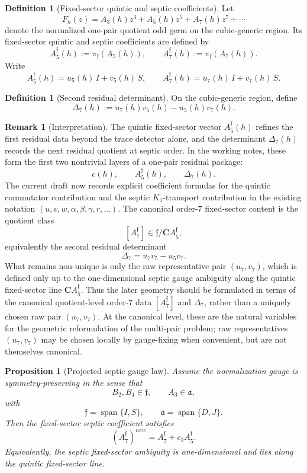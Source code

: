\documentclass[11pt,a4paper]{amsart}
\def\new{new}%
\theoremstyle{plain}
\newtheorem{proposition}[theorem]{Proposition}
\theoremstyle{definition}
\newtheorem{definition}[theorem]{Definition}
\newtheorem{remark}[theorem]{Remark}
\newcommand{\new}{\mathrm{new}}
\begin{document}
\begin{definition}[Fixed-sector quintic and septic coefficients]
\label{def:fixed-sector-quintic-septic}
Let
\[
F_h(z)=A_3(h)z^3+A_5(h)z^5+A_7(h)z^7+\cdots
\]
denote the normalized one-pair quotient odd germ on the cubic-generic region.
Its fixed-sector quintic and septic coefficients are defined by
\[
A_5^{\mathfrak f}(h):=\pi_{\mathfrak f}(A_5(h)),
\qquad
A_7^{\mathfrak f}(h):=\pi_{\mathfrak f}(A_7(h)).
\]
Write
\[
A_5^{\mathfrak f}(h)=u_5(h)\,I+v_5(h)\,S,
\qquad
A_7^{\mathfrak f}(h)=u_7(h)\,I+v_7(h)\,S.
\]
\end{definition}

\begin{definition}[Second residual determinant]
\label{def:second-residual-determinant}
On the cubic-generic region, define
\[
\Delta_7(h):=u_7(h)v_5(h)-u_5(h)v_7(h).
\]
\end{definition}

\begin{remark}[Interpretation]
\label{rem:fixed-sector-residual-package}
The quintic fixed-sector vector $A_5^{\mathfrak f}(h)$ refines the first
residual data beyond the trace detector alone, and the determinant
$\Delta_7(h)$ records the next residual quotient at septic order. In the
working notes, these form the first two nontrivial layers of a one-pair
residual package:
\[
c(h),\qquad A_5^{\mathfrak f}(h),\qquad \Delta_7(h).
\]
The current draft now records explicit coefficient formulas for the quintic
commutator contribution and the septic $K_1$-transport contribution in the
existing notation $(u,v,w,\alpha,\beta,\gamma,r,\dots)$. The canonical
order-$7$ fixed-sector content is the quotient class
\[
[A_7^{\mathfrak f}] \in \mathfrak f/\mathbf C A_5^{\mathfrak f},
\]
equivalently the second residual determinant
\[
\Delta_7=u_7v_5-u_5v_7.
\]
What remains non-unique is only the raw representative pair $(u_7,v_7)$,
which is defined only up to the one-dimensional septic gauge ambiguity along
the quintic fixed-sector line $\mathbf C A_5^{\mathfrak f}$. Thus the later
geometry should be formulated in terms of the canonical quotient-level order-$7$
data $[A_7^{\mathfrak f}]$ and $\Delta_7$, rather than a uniquely chosen
raw pair $(u_7,v_7)$. At the canonical level, these are the natural variables
for the geometric reformulation of the multi-pair problem; raw representatives
$(u_7,v_7)$ may be chosen locally by gauge-fixing when convenient, but are
not themselves canonical.
\end{remark}

\begin{proposition}[Projected septic gauge law]
\label{prop:projected-septic-gauge-law}
Assume the normalization gauge is symmetry-preserving in the sense that
\[
B_2,B_4\in \mathfrak f,
\qquad
A_3\in \mathfrak a,
\]
with
\[
\mathfrak f=\operatorname{span}\{I,S\},
\qquad
\mathfrak a=\operatorname{span}\{D,J\}.
\]
Then the fixed-sector septic coefficient satisfies
\[
(A_7^{\mathfrak f})^{\new}=A_7^{\mathfrak f}+c_2A_5^{\mathfrak f}.
\]
Equivalently, the septic fixed-sector ambiguity is one-dimensional and lies
along the quintic fixed-sector line.
\end{proposition}
\end{document}
